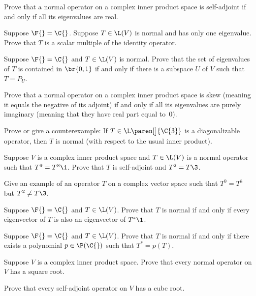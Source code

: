 
\exercise
Prove that a normal operator on a complex inner product space is self-adjoint if and only if all its eigenvalues are real.\label{7normalreal}


\exercise
Suppose $\F{} = \C{}$. Suppose $T \in \L(V)$ is normal and has only one eigenvalue. Prove that $T$ is a scalar multiple of the identity operator.


\exercise
Suppose $\F{} = \C{}$ and $T \in \L(V)$ is normal. Prove that the set of eigenvalues of $T$ is contained in $\br{0, 1}$ if and only if there is a subspace $U$ of $V$ such that $T = P_{\!U}$.


\exercise
Prove that a normal operator on a complex inner product space is skew (meaning it equals the negative of its adjoint) if and only if all its eigenvalues are purely imaginary (meaning that they have real part equal to~$0$).


\exercise
Prove or give a counterexample:  If $T \in \L\paren[\big]{\C{3}}$ is a diagonalizable operator, then $T$ is normal (with respect to the usual inner product).


\exercise
Suppose $V$ is a complex inner product space and $T \in \L(V)$ is a normal
operator such that $T^9 = T^8\1$.  Prove that $T$ is self-adjoint and $T^2 =T\3$.


\exercise
Give an example of an operator $T$ on a complex vector space
such that $T^9 = T^8$ but $T^2 \ne T\3$.


\exercise
Suppose $\F{} = \C{}$ and $T \in \L(V)$. Prove that $T$ is normal if and only if every eigenvector of $T$ is also an eigenvector of $T^*\1$.


\exercise
Suppose $\F{} = \C{}$ and $T \in \L(V)$. Prove that $T$ is normal if and only if there exists a polynomial $p \in \P(\C{})$ such that
$T^* = p(T)$.\label{4pnormal}


\exercise
Suppose $V$ is a complex inner product space.  Prove that every normal
operator on $V$ has a square root.


\exercise
Prove that every self-adjoint operator on $V$ has a cube root.


